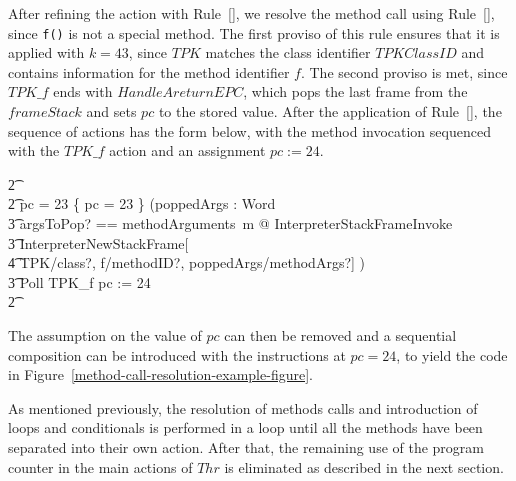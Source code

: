 After refining the action with
Rule~[], we resolve the method call
using Rule~[], since \texttt{f()}
is not a special method.
The first proviso of this rule ensures that it is applied with
$k = 43$, since $TPK$ matches the class identifier $TPKClassID$ and
contains information for the method identifier $f$.
The second proviso is met, since $TPK\_f$ ends with
$HandleAreturnEPC$, which pops the last frame from the $frameStack$
and sets $pc$ to the stored value.
After the application of Rule~[],
the sequence of actions has the form below, with the method invocation
sequenced with the $TPK\_f$ action and an assignment $pc := 24$.
\begin{circusaction}
  \t2 {} \cdots {} \\
  \t2 {} \circelse pc = 23 \circthen \{ pc = 23 \} \circseq (\circvar poppedArgs : \seq Word \circspot \\
  \t3 \lschexpract \exists argsToPop? == methodArguments~m @ InterpreterStackFrameInvoke \rschexpract \circseq \\
  \t3 \lschexpract InterpreterNewStackFrame[ \\
  \t4 TPK/class?, f/methodID?, poppedArgs/methodArgs?] \rschexpract) \circseq \\
  \t3 Poll \circseq TPK\_f \circseq pc := 24 \\
  \t2 {} \cdots {}
\end{circusaction}
The assumption on the value of $pc$ can then be removed and a
sequential composition can be introduced with the instructions at
$pc = 24$, to yield the code in
Figure~\ref{method-call-resolution-example-figure}.

As mentioned previously, the resolution of methods calls and
introduction of loops and conditionals is performed in a loop until all
the methods have been separated into their own action.
After that, the remaining use of the program counter in the main
actions of $Thr$ is eliminated as described in the next section.
